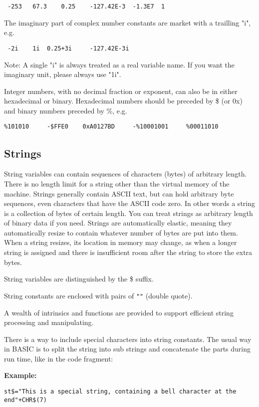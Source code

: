 \begin{verbatim}
 -253 	67.3 	0.25 	-127.42E-3 	-1.3E7 	1
\end{verbatim}

The imaginary part of complex number constants are market with a trailling "i", e.g.

\begin{verbatim}
 -2i 	1i 	0.25+3i     -127.42E-3i
\end{verbatim}
Note: A single "i" is always treated as a real variable name. 
If you want the imaginary unit, please always use "1i".

Integer numbers, with no decimal fraction or exponent, can also be in either 
hexadecimal or binary. Hexadecimal numbers should be preceded by \$ (or 0x) and 
binary numbers preceded by \%, e.g. 

\begin{verbatim}
%101010     -$FFE0    0xA0127BD     -%10001001     %00011010
\end{verbatim}

\subsection{Strings}

String variables can contain sequences of characters (bytes) of arbitrary 
length. There is no length limit for a string other than the virtual memory of
the machine. Strings generally contain ASCII text, but can hold arbitrary byte
sequences, even characters that have the ASCII code zero. In other words a
string is a collection of bytes of certain length. You can treat strings as
arbitrary length of binary data if you need. Strings are automatically
elastic, meaning they automatically resize to contain whatever number of bytes
are put into them. When a string resizes, its location in memory may change, as
when a longer string is assigned and there is insufficient room after the string
to store the extra bytes.

String variables are distinguished by the \$ suffix.

String constants are enclosed with pairs of \verb|""| (double quote). 

A wealth of intrinsics and functions are provided to support efficient string
processing and manipulating. 

There is a way to include special characters into string constants. 
The usual way in BASIC is to split the string into sub strings and concatenate 
the parts during run time, like in the code fragment:
\begin{mdframed}[hidealllines=true,backgroundcolor=blue!20]
{\bf Example:}
{\footnotesize
\begin{verbatim}
st$="This is a special string, containing a bell character at the end"+CHR$(7)
\end{verbatim}
}
\end{mdframed}

